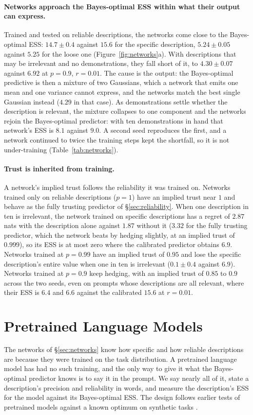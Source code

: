 \documentclass{article}
\begin{document}
\paragraph{Networks approach the Bayes-optimal ESS within what their output can express.} Trained and tested on reliable descriptions, the networks come close to the Bayes-optimal ESS: $14.7 \pm 0.4$ against $15.6$ for the specific description, $5.24 \pm 0.05$ against $5.25$ for the loose one (Figure~\ref{fig:networks}a). With descriptions that may be irrelevant and no demonstrations, they fall short of it, to $4.30 \pm 0.07$ against $6.92$ at $p = 0.9$, $r = 0.01$. The cause is the output: the Bayes-optimal predictive is then a mixture of two Gaussians, which a network that emits one mean and one variance cannot express, and the networks match the best single Gaussian instead ($4.29$ in that case). As demonstrations settle whether the description is relevant, the mixture collapses to one component and the networks rejoin the Bayes-optimal predictor: with ten demonstrations in hand that network's ESS is $8.1$ against $9.0$. A second seed reproduces the first, and a network continued to twice the training steps kept the shortfall, so it is not under-training (Table~\ref{tab:networks}).

\paragraph{Trust is inherited from training.} A network's implied trust follows the reliability it was trained on. Networks trained only on reliable descriptions ($p = 1$) have an implied trust near $1$ and behave as the fully trusting predictor of \S\ref{sec:reliability}. When one description in ten is irrelevant, the network trained on specific descriptions has a regret of $2.87$ nats with the description alone against $1.87$ without it ($3.32$ for the fully trusting predictor, which the network beats by hedging slightly, at an implied trust of $0.999$), so its ESS is at most zero where the calibrated predictor obtains $6.9$. Networks trained at $p = 0.99$ have an implied trust of $0.95$ and lose the specific description's entire value when one in ten is irrelevant ($0.1 \pm 0.4$ against $6.9$). Networks trained at $p = 0.9$ keep hedging, with an implied trust of $0.85$ to $0.9$ across the two seeds, even on prompts whose descriptions are all relevant, where their ESS is $6.4$ and $6.6$ against the calibrated $15.6$ at $r = 0.01$.

\section{Pretrained Language Models}\label{sec:llm}
The networks of \S\ref{sec:networks} know how specific and how reliable descriptions are because they were trained on the task distribution. A pretrained language model has had no such training, and the only way to give it what the Bayes-optimal predictor knows is to say it in the prompt. We say nearly all of it, state a description's precision and reliability in words, and measure the description's ESS for the model against its Bayes-optimal ESS. The design follows earlier tests of pretrained models against a known optimum on synthetic tasks \citep{gupta2025, akata2026}.
\end{document}
